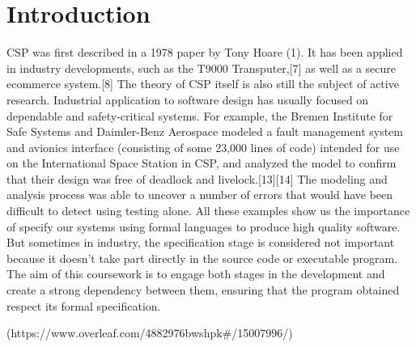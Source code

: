 \documentclass{comjnl}
\begin{document}
\section{Introduction}
CSP was first described in a 1978 paper by Tony Hoare (1). It has been applied in 
industry developments, such as the T9000 Transputer,[7] as well as a secure ecommerce system.[8]
The theory of CSP itself is also still the subject of active research. Industrial application to software design has usually focused on dependable and safety-critical systems. For example, the Bremen Institute for Safe Systems and Daimler-Benz Aerospace modeled a fault management system and avionics interface (consisting of some 23,000 lines of code) intended for use on the International Space Station in CSP, and analyzed the model to confirm that their design was free of deadlock and livelock.[13][14] The modeling and analysis process was able to uncover a number of errors that would have been difficult to detect using testing alone. 
All these examples show us the importance of specify our systems using formal languages to produce high quality software.
But sometimes in industry, the specification stage is considered not important because it doesn't take part directly in the source code or executable program. The aim of this coursework is to engage both stages in the development and create a strong dependency between them, ensuring that the program obtained respect its formal specification.


(https://www.overleaf.com/4882976bwshpk#/15007996/)
\end{document}
